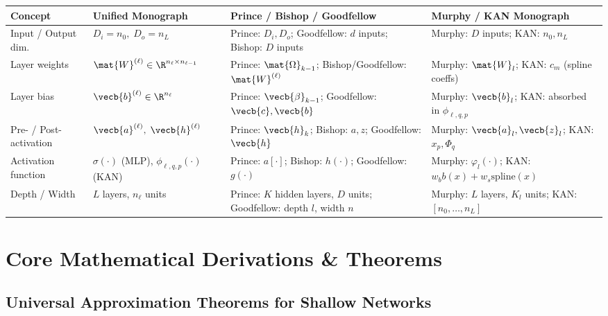 \documentclass[../../../../master.tex]{subfiles}
\begin{document}
\begin{crossbook}
\label{tab:mlpkan:notation}
\small
\begin{tabularx}{\textwidth}{@{} >{\raggedright\arraybackslash}p{2.7cm} >{\raggedright\arraybackslash}p{2.9cm} >{\raggedright\arraybackslash}X >{\raggedright\arraybackslash}X @{}}
\toprule
\textbf{Concept} & \textbf{Unified Monograph} & \textbf{Prince / Bishop / Goodfellow} & \textbf{Murphy / KAN Monograph} \\
\midrule
Input / Output dim. & $D_i = n_0,\; D_o = n_L$ & Prince: $D_i, D_o$; Goodfellow: $d$ inputs; Bishop: $D$ inputs & Murphy: $D$ inputs; KAN: $n_0, n_L$ \\
Layer weights & $\mat{W}^{(\ell)} \in \R^{n_\ell \times n_{\ell-1}}$ & Prince: $\mat{\Omega}_{k-1}$; Bishop/Goodfellow: $\mat{W}^{(\ell)}$ & Murphy: $\mat{W}_l$; KAN: $c_m$ (spline coeffs) \\
Layer bias & $\vecb{b}^{(\ell)} \in \R^{n_\ell}$ & Prince: $\vecb{\beta}_{k-1}$; Goodfellow: $\vecb{c}, \vecb{b}$ & Murphy: $\vecb{b}_l$; KAN: absorbed in $\phi_{\ell,q,p}$ \\
Pre- / Post-activation & $\vecb{a}^{(\ell)},\; \vecb{h}^{(\ell)}$ & Prince: $\vecb{h}_k$; Bishop: $a, z$; Goodfellow: $\vecb{h}$ & Murphy: $\vecb{a}_l, \vecb{z}_l$; KAN: $x_p, \Phi_q$ \\
Activation function & $\sigma(\cdot)$ (MLP), $\phi_{\ell,q,p}(\cdot)$ (KAN) & Prince: $a[\cdot]$; Bishop: $h(\cdot)$; Goodfellow: $g(\cdot)$ & Murphy: $\varphi_l(\cdot)$; KAN: $w_b b(x) + w_s \mathrm{spline}(x)$ \\
Depth / Width & $L$ layers, $n_\ell$ units & Prince: $K$ hidden layers, $D$ units; Goodfellow: depth $l$, width $n$ & Murphy: $L$ layers, $K_l$ units; KAN: $[n_0,\dots,n_L]$ \\
\bottomrule
\end{tabularx}
\end{crossbook}

\section{Core Mathematical Derivations \& Theorems}
\label{sec:mlpkan:theory}

\subsection{Universal Approximation Theorems for Shallow Networks}
\end{document}
